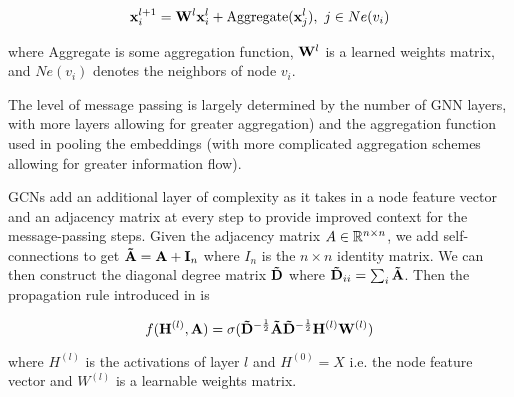 \begin{equation}
\mVector{x}_i^{l+1} = \mVector{W}^{l}\mVector{x}_i^{l} + \text{Aggregate}(\mVector{x}_j^{l}),\ j \in Ne(v_i)
\end{equation}

where Aggregate is some aggregation function, $\mVector{W}^{l}$ is a learned weights matrix, and $Ne(v_i)$ denotes the neighbors of node $v_i$.

The level of message passing is largely determined by the number of GNN layers, with more layers allowing for greater aggregation) and the aggregation function used in pooling the embeddings (with more complicated aggregation schemes allowing for greater information flow).

GCNs add an additional layer of complexity as it takes in a node feature vector and an adjacency matrix at every step to provide improved context for the message-passing steps. Given the adjacency matrix $A \in \mathbb{R}^{n \times n}$, we add self-connections to get $\mVector{\tilde{A}} = \mVector{A} + \mVector{I}_n$ where $I_n$ is the $n \times n$ identity matrix. We can then construct the diagonal degree matrix $\mVector{\tilde{D}}$ where $\mVector{\tilde{D}}_{ii} = \sum_i\mVector{\tilde{A}}$. Then the propagation rule introduced in \cite{Kipf2017} is

\begin{equation}
f(\mVector{H}^{(l)}, \mVector{A}) = \sigma(\mVector{\tilde{D}}^{-\frac{1}{2}}\mVector{\tilde{A}}\mVector{\tilde{D}}^{-\frac{1}{2}}\mVector{H}^{(l)}\mVector{W}^{(l)})
\end{equation}

where $H^{(l)}$ is the activations of layer $l$ and $H^{(0)} = X$ i.e. the node feature vector and $W^{(l)}$ is a learnable weights matrix.

